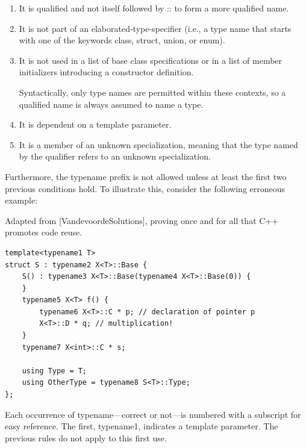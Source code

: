 \begin{enumerate}
\item 
It is qualified and not itself followed by :: to form a more qualified name.

\item 
It is not part of an elaborated-type-specifier (i.e., a type name that starts with one of the keywords class, struct, union, or enum).

\item 
It is not used in a list of base class specifications or in a list of member initializers introducing a constructor definition.

\begin{tcolorbox}[colback=webgreen!5!white,colframe=webgreen!75!black]
\hspace*{0.75cm}Syntactically, only type names are permitted within these contexts, so a qualified name is always assumed to name a type.
\end{tcolorbox}

\item 
It is dependent on a template parameter.

\item 
It is a member of an unknown specialization, meaning that the type named by the qualifier refers to an unknown specialization.
\end{enumerate}

Furthermore, the typename prefix is not allowed unless at least the first two previous conditions hold. To illustrate this, consider the following erroneous example:

\begin{tcolorbox}[colback=webgreen!5!white,colframe=webgreen!75!black]
\hspace*{0.75cm}Adapted from [VandevoordeSolutions], proving once and for all that C++ promotes code reuse.
\end{tcolorbox}

\begin{lstlisting}[style=styleCXX]
template<typename1 T>
struct S : typename2 X<T>::Base {
	S() : typename3 X<T>::Base(typename4 X<T>::Base(0)) {
	}
	typename5 X<T> f() {
		typename6 X<T>::C * p; // declaration of pointer p
		X<T>::D * q; // multiplication!
	}
	typename7 X<int>::C * s;
	
	using Type = T;
	using OtherType = typename8 S<T>::Type;
};
\end{lstlisting}

Each occurrence of typename—correct or not—is numbered with a subscript for easy reference. The first, typename1, indicates a template parameter. The previous rules do not apply to this first use.

